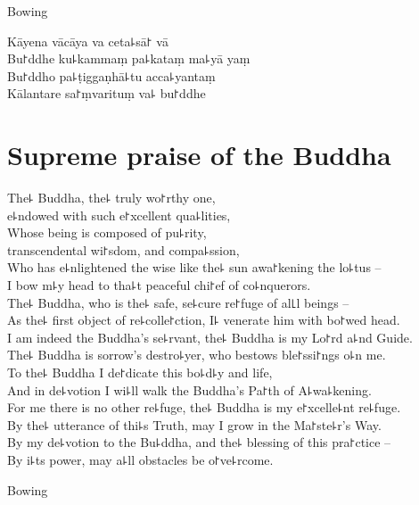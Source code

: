 \begin{instruction}
  Bowing
\end{instruction}

Kāyena vācāya va ceta꜕sā꜓ vā\\
Bu꜓ddhe ku꜕kammaṃ pa꜕kataṃ ma꜕yā yaṃ\\
Bu꜓ddho pa꜕ṭiggaṇhā꜕tu acca꜕yantaṃ\\
Kālantare sa꜓ṃvarituṃ va꜕ bu꜓ddhe

\clearpage

\chapter{Supreme praise of the Buddha}%

\begin{leader}
\end{leader}

The꜕ Buddha, the꜕ truly wo꜓rthy one,\\
\vin e꜕ndowed with such e꜓xcellent qua꜕lities,\\
Whose being is composed of pu꜕rity,\\
\vin transcendental wi꜓sdom, and compa꜕ssion,\\
Who has e꜕nlightened the wise like the꜕ sun awa꜓kening the lo꜕tus --\\
I bow m꜕y head to tha꜕t peaceful chi꜓ef of co꜕nquerors.\\
The꜕ Buddha, who is the꜕ safe, se꜕cure re꜓fuge of al꜖l beings --\\
As the꜕ first object of re꜕colle꜓ction, I꜕ venerate him with bo꜓wed head.\\
I am indeed the Buddha's se꜕rvant, the꜕ Buddha is my Lo꜓rd a꜕nd Guide.\\
The꜕ Buddha is sorrow's destro꜕yer, who bestows ble꜓ssi꜓ngs o꜕n me.\\
To the꜕ Buddha I de꜓dicate this bo꜕d꜕y and life,\\
And in de꜕votion I wi꜕ll walk the Buddha's Pa꜓th of A꜕wa꜕kening.\\
For me there is no other re꜕fuge, the꜕ Buddha is my e꜓xcelle꜕nt re꜕fuge.\\
By the꜕ utterance of thi꜕s Truth, may I grow in the Ma꜓ste꜕r's Way.\\
By my de꜕votion to the Bu꜕ddha, and the꜕ blessing of this pra꜓ctice --\\
By i꜕ts power, may a꜕ll obstacles be o꜓ve꜕rcome.

\begin{instruction}
  Bowing
\end{instruction}

